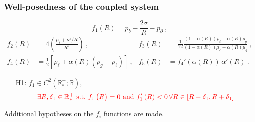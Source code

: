 \documentclass[10pt,aspectratio=169]{beamer}
\begin{document}
\begin{frame}
\frametitle{Well-posedness of the coupled system}
\begin{equation*}
	f_1\left(R\right)=p_b-\frac{2\sigma}{R}-p_\partial~,
\end{equation*}
\begin{align*}
f_2\left(R\right)&=4\left(\frac{\mu_\ell+\kappa^s/R}{R^2}\right)~,&f_3\left(R\right)&=\frac{1}{12}\frac{(1-\alpha\left(R\right))\rho_\ell+\alpha\left(R\right)\rho_g}{(1-\alpha\left(R\right))\mu_\ell+\alpha\left(R\right)\mu_g}~,\\ f_4\left(R\right)&=\frac{1}{2}\left[\rho_\ell+\alpha\left(R\right)\left(\rho_g-\rho_\ell\right)\right]~,&f_5\left(R\right)&=f_4'\left(\alpha\left(R\right)\right)\,\alpha'\left(R\right)~.
\end{align*}

\begin{itemize}
	\item[H1:] $f_1\in C^2\left(\mathbb{R}^+_*;\mathbb{R}\right)$, $${\color{red}\exists \bar{R},\delta_1\in\mathbb{R}^+_*~\text{s.t.}~f_1\left(\bar{R}\right)=0~\text{and}~f'_1\left(R\right)<0\, \forall R \in [\bar{R}-\delta_1,\bar{R}+\delta_1]}$$
\end{itemize}
Additional hypotheses on the $f_i$ functions are made.
\end{frame} 


\end{document}
